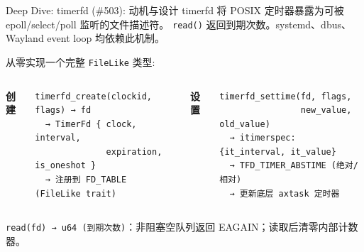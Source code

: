 \documentclass[aspectratio=169,10pt]{ctexbeamer}
\newcommand{\syscall}[1]{\texttt{#1}}
\newcommand{\code}[1]{\texttt{#1}}
\begin{document}

\begin{frame}[fragile,shrink=15]{Deep Dive: timerfd (\#503): 动机与设计}
timerfd 将 POSIX 定时器暴露为可被 epoll/select/poll 监听的文件描述符。
\syscall{read()} 返回到期次数。systemd、dbus、Wayland event loop 均依赖此机制。

\vspace{1mm}
从零实现一个完整 \code{FileLike} 类型:

\begin{columns}[T]
\small
\textbf{创建}
\begin{verbatim}
timerfd_create(clockid, flags) → fd
  → TimerFd { clock, interval,
              expiration, is_oneshot }
  → 注册到 FD_TABLE (FileLike trait)
\end{verbatim}

\small
\textbf{设置}
\begin{verbatim}
timerfd_settime(fd, flags,
                new_value, old_value)
  → itimerspec: {it_interval, it_value}
  → TFD_TIMER_ABSTIME (绝对/相对)
  → 更新底层 axtask 定时器
\end{verbatim}
\end{columns}

\vspace{1mm}
\begin{center}
\syscall{read(fd) → u64 (到期次数)}：非阻塞空队列返回 EAGAIN；读取后清零内部计数器。
\end{center}
\end{frame}

\end{document}
